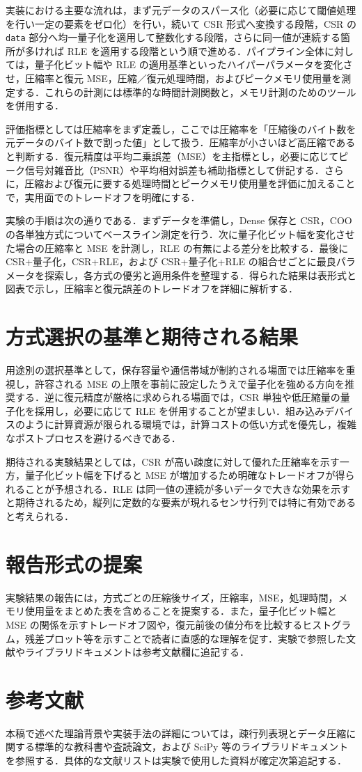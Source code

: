実装における主要な流れは，まず元データのスパース化（必要に応じて閾値処理を行い一定の要素をゼロ化）を行い，続いて CSR 形式へ変換する段階，CSR の \texttt{data} 部分へ均一量子化を適用して整数化する段階，さらに同一値が連続する箇所が多ければ RLE を適用する段階という順で進める．パイプライン全体に対しては，量子化ビット幅や RLE の適用基準といったハイパーパラメータを変化させ，圧縮率と復元 MSE，圧縮／復元処理時間，およびピークメモリ使用量を測定する．これらの計測には標準的な時間計測関数と，メモリ計測のためのツールを併用する．

評価指標としては圧縮率をまず定義し，ここでは圧縮率を「圧縮後のバイト数を元データのバイト数で割った値」として扱う．圧縮率が小さいほど高圧縮であると判断する．復元精度は平均二乗誤差（MSE）を主指標とし，必要に応じてピーク信号対雑音比（PSNR）や平均相対誤差も補助指標として併記する．さらに，圧縮および復元に要する処理時間とピークメモリ使用量を評価に加えることで，実用面でのトレードオフを明確にする．

実験の手順は次の通りである．まずデータを準備し，Dense 保存と CSR，COO の各単独方式についてベースライン測定を行う．次に量子化ビット幅を変化させた場合の圧縮率と MSE を計測し，RLE の有無による差分を比較する．最後に CSR+量子化，CSR+RLE，および CSR+量子化+RLE の組合せごとに最良パラメータを探索し，各方式の優劣と適用条件を整理する．得られた結果は表形式と図表で示し，圧縮率と復元誤差のトレードオフを詳細に解析する．

\section{方式選択の基準と期待される結果}
用途別の選択基準として，保存容量や通信帯域が制約される場面では圧縮率を重視し，許容される MSE の上限を事前に設定したうえで量子化を強める方向を推奨する．逆に復元精度が厳格に求められる場面では，CSR 単独や低圧縮量の量子化を採用し，必要に応じて RLE を併用することが望ましい．組み込みデバイスのように計算資源が限られる環境では，計算コストの低い方式を優先し，複雑なポストプロセスを避けるべきである．

期待される実験結果としては，CSR が高い疎度に対して優れた圧縮率を示す一方，量子化ビット幅を下げると MSE が増加するため明確なトレードオフが得られることが予想される．RLE は同一値の連続が多いデータで大きな効果を示すと期待されるため，縦列に定数的な要素が現れるセンサ行列では特に有効であると考えられる．

\section*{報告形式の提案}
実験結果の報告には，方式ごとの圧縮後サイズ，圧縮率，MSE，処理時間，メモリ使用量をまとめた表を含めることを提案する．また，量子化ビット幅と MSE の関係を示すトレードオフ図や，復元前後の値分布を比較するヒストグラム，残差プロット等を示すことで読者に直感的な理解を促す．実験で参照した文献やライブラリドキュメントは参考文献欄に追記する．

\section*{参考文献}
本稿で述べた理論背景や実装手法の詳細については，疎行列表現とデータ圧縮に関する標準的な教科書や査読論文，および SciPy 等のライブラリドキュメントを参照する．具体的な文献リストは実験で使用した資料が確定次第追記する．